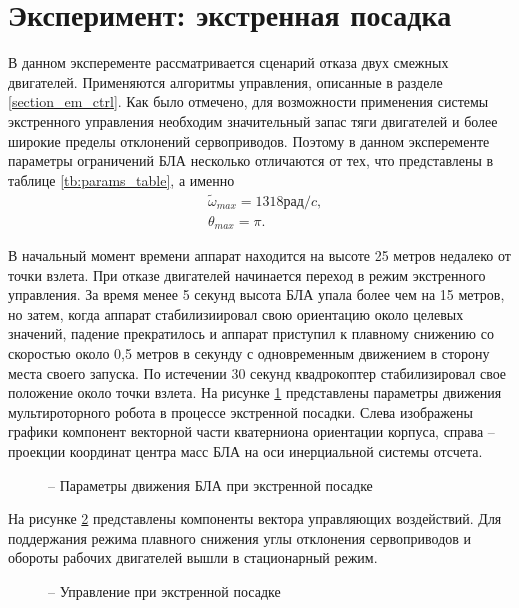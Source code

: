 \section{Эксперимент: экстренная посадка}

В данном эксперементе рассматривается сценарий отказа двух смежных двигателей. Применяются алгоритмы управления, описанные в разделе \ref{section_em_ctrl}. Как было отмечено, для возможности применения системы экстренного управления необходим значительный запас тяги двигателей и более широкие пределы отклонений сервоприводов. Поэтому в данном эксперементе параметры ограничений БЛА несколько отличаются от тех, что представлены в таблице \ref{tb:params_table}, а именно
\begin{equation}
\begin{aligned}
&\tilde{\omega}_{max} = 1318 рад/c,
\\
&\theta_{max} = \pi.
\end{aligned}
\end{equation}

В начальный момент времени аппарат находится на высоте 25 метров недалеко от точки взлета.
При отказе двигателей начинается переход в режим экстренного управления.
За время менее 5 секунд высота БЛА упала более чем на 15 метров, но затем, когда аппарат стабилизиировал свою ориентацию около целевых значений, падение прекратилось и аппарат приступил к плавному снижению со скоростью около 0,5 метров в секунду с одновременным движением в сторону места своего запуска. По истечении 30 секунд квадрокоптер стабилизировал свое положение около точки взлета. На рисунке \ref{fig:em_coords} представлены параметры движения мультироторного робота в процессе экстренной посадки. Слева изображены графики компонент векторной части кватерниона ориентации корпуса, справа -- проекции координат центра масс БЛА на оси инерциальной системы отсчета.
\begin{figure}
	
	\centering
	\hfil
	\subfloat[коордиата x]{\texttt{[image: em/x]}}
	
	 \hfil 
	\subfloat[коордиата y]{\texttt{[image: em/y]}}  
	
	\hfil
	\subfloat[коордиата z]{\texttt{[image: em/z]}}
	\caption{ -- Параметры движения БЛА при экстренной посадке}
	\label{fig:em_coords}
\end{figure}
На рисунке \ref{fig:em_ctrl} представлены компоненты вектора управляющих воздействий.
Для поддержания режима плавного снижения углы отклонения сервоприводов и обороты рабочих двигателей вышли в стационарный режим.
\begin{figure}
	
	\centering
	
	\caption{ -- Управление при экстренной посадке}
	\label{fig:em_ctrl}
\end{figure}